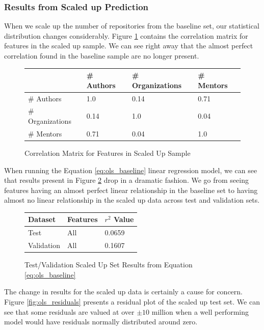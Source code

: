 \documentclass{article}
\begin{document}
\subsubsection{Results from Scaled up Prediction}

When we scale up the number of repositories from the baseline set,
our statistical distribution changes considerably. Figure
\ref{fig:corr_scale} contains the correlation matrix for features in
the scaled up sample. We can see right away that the almost perfect
correlation found in the baseline sample are no longer present.

\begin{figure}[h]
  \centering
  \begin{tabular}{ l|l|l|l }
    & \# Authors & \# Organizations & \# Mentors \\
    \hline
    \# Authors       & 1.0   & 0.14  & 0.71 \\
    \# Organizations & 0.14  & 1.0  &  0.04 \\
    \# Mentors       & 0.71 & 0.04 & 1.0  \\
  \end{tabular}
  \caption{Correlation Matrix for Features in Scaled Up Sample}
  \label{fig:corr_scale}
\end{figure}

When running the Equation \ref{eq:ols_baseline} linear regression model,
we can see that results present in Figure \ref{fig:ols_scale} drop in a
dramatic fashion. We go from seeing features having an almost perfect linear
relationship in the baseline set to having almost no linear relationship
in the scaled up data across test and validation sets.

\begin{figure}[h]
  \centering
  \begin{tabular}{ l|l|l }
    Dataset & Features & $r^2$ Value \\
    \hline
    Test       & All        & 0.0659 \\
    Validation & All        & 0.1607 \\
  \end{tabular}
  \caption{Test/Validation Scaled Up Set Results from Equation
    \ref{eq:ols_baseline}}
  \label{fig:ols_scale}
\end{figure}

The change in results for the scaled up data is certainly a cause for
concern. Figure \ref{fig:ols_residuals} presents a residual plot of the
scaled up test set. We can see that some residuals are valued at over
$\pm 10$ million when a well performing model would have residuals normally
distributed around zero.
\end{document}
